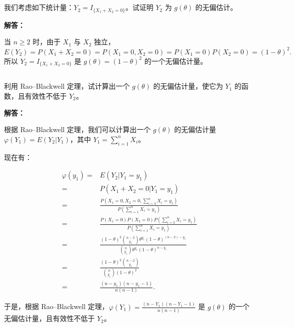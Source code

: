 \documentclass[12pt,a4paper]{article}
\begin{document}
\subsection{}

 我们考虑如下统计量：$Y_2=I_{\{X_1+X_2=0\}}$。试证明 $Y_2$ 为 $g(\theta)$ 的无偏估计。
  
\begin{answerbox}
\textbf{解答：}

当 $n\geq 2$ 时，由于 $X_1$ 与 $X_2$ 独立，
\[
E(Y_2)=P(X_1+X_2=0)=P(X_1=0,X_2=0)=P(X_1=0)P(X_2=0)=(1-\theta)^2.
\]
所以 $Y_2=I_{\{X_1+X_2=0\}}$ 是 $g(\theta)=(1-\theta)^2$ 的一个无偏估计量。
\end{answerbox}

\subsection{}

 利用 Rao--Blackwell 定理，试计算出一个 $g(\theta)$ 的无偏估计量，使它为 $Y_1$ 的函数，且有效性不低于 $Y_2$。

\begin{answerbox}
\textbf{解答：}

根据 Rao--Blackwell 定理，我们可以计算出一个 $g(\theta)$ 的无偏估计量 $\varphi(Y_1) = E(Y_2 | Y_1)$，其中 $Y_1 = \sum_{i=1}^n X_i$。

现在有：

$$
\begin{aligned}
\varphi(y_1) =& E(Y_2 | Y_1 = y_1) \\
=& P(X_1 + X_2 = 0 | Y_1 = y_1) \\
=& \frac{P\left(X_1 = 0, X_2 = 0, \sum_{i=3}^n X_i = y_1\right)}{P\left(\sum_{i=1}^n X_i = y_1\right)} \\
=& \frac{P(X_1 = 0) P(X_2 = 0) P\left(\sum_{i=3}^n X_i = y_1\right)}{P\left(\sum_{i=1}^n X_i = y_1\right)} \\
=& \frac{(1-\theta)^2 \binom{n-2}{y_1} \theta^{y_1} (1-\theta)^{(n-2)-y_1}}{\binom{n}{y_1} \theta^{y_1} (1-\theta)^{n-y_1}} \\
=& \frac{(1-\theta)^2 \binom{n-2}{y_1}}{\binom{n}{y_1} (1-\theta)^2} \\
=& \frac{(n-y_1)(n-y_1-1)}{n(n-1)}.
\end{aligned}
$$

于是，根据 Rao--Blackwell 定理，$\varphi(Y_1) = \frac{(n-Y_1)(n-Y_1-1)}{n(n-1)}$ 是 $g(\theta)$ 的一个无偏估计量，且有效性不低于 $Y_2$。


\end{answerbox}
\end{document}
